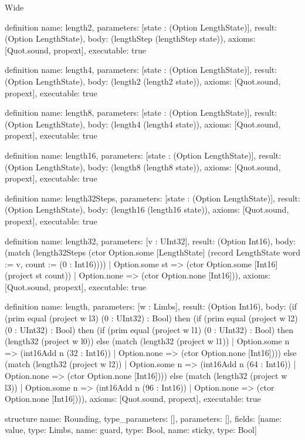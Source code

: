 \begin{lexlean}{Wide}
\begin{semanticmodule}
definition{
  name: length2,
  parameters: [state : (Option LengthState)],
  result: (Option LengthState),
  body: (lengthStep (lengthStep state)),
  axioms: [Quot.sound, propext],
  executable: true
}

definition{
  name: length4,
  parameters: [state : (Option LengthState)],
  result: (Option LengthState),
  body: (length2 (length2 state)),
  axioms: [Quot.sound, propext],
  executable: true
}

definition{
  name: length8,
  parameters: [state : (Option LengthState)],
  result: (Option LengthState),
  body: (length4 (length4 state)),
  axioms: [Quot.sound, propext],
  executable: true
}

definition{
  name: length16,
  parameters: [state : (Option LengthState)],
  result: (Option LengthState),
  body: (length8 (length8 state)),
  axioms: [Quot.sound, propext],
  executable: true
}

definition{
  name: length32Steps,
  parameters: [state : (Option LengthState)],
  result: (Option LengthState),
  body: (length16 (length16 state)),
  axioms: [Quot.sound, propext],
  executable: true
}

definition{
  name: length32,
  parameters: [v : UInt32],
  result: (Option Int16),
  body: (match (length32Steps (ctor Option.some [LengthState] (record LengthState {word := v, count := (0 : Int16)})))
    | Option.some st => (ctor Option.some [Int16] (project st count))
    | Option.none => (ctor Option.none [Int16])),
  axioms: [Quot.sound, propext],
  executable: true
}

definition{
  name: length,
  parameters: [w : Limbs],
  result: (Option Int16),
  body: (if (prim equal (project w l3) (0 : UInt32) : Bool) then (if (prim equal (project w l2) (0 : UInt32) : Bool) then (if (prim equal (project w l1) (0 : UInt32) : Bool) then (length32 (project w l0)) else (match (length32 (project w l1))
    | Option.some n => (int16Add n (32 : Int16))
    | Option.none => (ctor Option.none [Int16]))) else (match (length32 (project w l2))
    | Option.some n => (int16Add n (64 : Int16))
    | Option.none => (ctor Option.none [Int16]))) else (match (length32 (project w l3))
    | Option.some n => (int16Add n (96 : Int16))
    | Option.none => (ctor Option.none [Int16]))),
  axioms: [Quot.sound, propext],
  executable: true
}

structure{
  name: Rounding,
  type_parameters: [],
  parameters: [],
  fields: [{name: value, type: Limbs}, {name: guard, type: Bool}, {name: sticky, type: Bool}]
}


\end{semanticmodule}
\end{lexlean}
